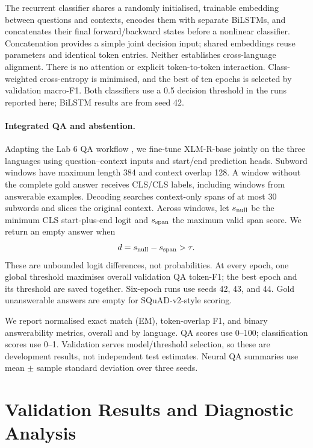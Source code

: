 \documentclass[11pt]{article}
\begin{document}
The recurrent classifier shares a randomly initialised, trainable embedding between questions and contexts, encodes them with separate BiLSTMs, and concatenates their final forward/backward states before a nonlinear classifier. Concatenation provides a simple joint decision input; shared embeddings reuse parameters and identical token entries. Neither establishes cross-language alignment. There is no attention or explicit token-to-token interaction. Class-weighted cross-entropy is minimised, and the best of ten epochs is selected by validation macro-F1. Both classifiers use a 0.5 decision threshold in the runs reported here; BiLSTM results are from seed 42.

\paragraph{Integrated QA and abstention.}
Adapting the Lab 6 QA workflow \citep{lab6}, we fine-tune XLM-R-base \citep{xlmr} jointly on the three languages using question--context inputs and start/end prediction heads. Subword windows have maximum length 384 and context overlap 128. A window without the complete gold answer receives CLS/CLS labels, including windows from answerable examples. Decoding searches context-only spans of at most 30 subwords and slices the original context. Across windows, let $s_{\rm null}$ be the minimum CLS start-plus-end logit and $s_{\rm span}$ the maximum valid span score. We return an empty answer when
\begin{equation}
d=s_{\rm null}-s_{\rm span}>\tau.
\end{equation}
These are unbounded logit differences, not probabilities. At every epoch, one global threshold maximises overall validation QA token-F1; the best epoch and its threshold are saved together. Six-epoch runs use seeds 42, 43, and 44. Gold unanswerable answers are empty for SQuAD-v2-style scoring.

We report normalised exact match (EM), token-overlap F1, and binary answerability metrics, overall and by language. QA scores use 0--100; classification scores use 0--1. Validation serves model/threshold selection, so these are development results, not independent test estimates. Neural QA summaries use mean $\pm$ sample standard deviation over three seeds.

\section{Validation Results and Diagnostic Analysis}
\end{document}
